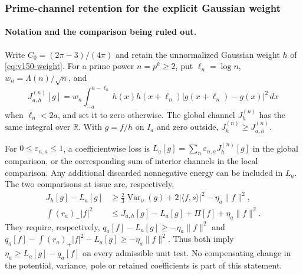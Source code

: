 \documentclass[11pt]{article}
\theoremstyle{remark}
\begin{document}
\subsubsection{Prime-channel retention for the explicit Gaussian weight}


\paragraph{Notation and the comparison being ruled out.}
Write $C_0=(2\pi-3)/(4\pi)$ and retain the unnormalized Gaussian weight
$h$ of \eqref{eq:v150-weight}. For a prime power $n=p^k\ge2$, put
$\ell_n=\log n$, $w_n=\Lambda(n)/\sqrt n$, and
\[
 J^{(n)}_{a,h}[g]
 =w_n\int_{-a}^{a-\ell_n}h(x)h(x+\ell_n)
                 |g(x+\ell_n)-g(x)|^2\,dx
\]
when $\ell_n<2a$, and set it to zero otherwise. The global channel
$J^{(n)}_h$ has the same integral over $\mathbb R$. With $g=f/h$ on
$I_a$ and zero outside, $J^{(n)}_h\ge J^{(n)}_{a,h}$.

For $0\le\varepsilon_{n,a}\le1$, a coefficientwise loss is
$L_a[g]=\sum_n\varepsilon_{n,a}J^{(n)}_h[g]$ in the global comparison,
or the corresponding sum of interior channels in the local comparison.
Any additional discarded nonnegative energy can be included in $L_a$.
The two comparisons at issue are, respectively,
\begin{align*}
 J_h[g]-L_a[g]&\ge\tfrac23\operatorname{Var}_\nu(g)
       +2|\langle f,s\rangle|^2-\eta_a\|f\|^2,\\
 \int(r_a)_-|f|^2&\le J_{a,h}[g]-L_a[g]+\Pi[f]
                                  +\eta_a\|f\|^2.
\end{align*}
They require, respectively, $q_a[f]-L_a[g]\ge-\eta_a\|f\|^2$
and $q_a[f]-\int(r_a)_+|f|^2-L_a[g]\ge-\eta_a\|f\|^2$.
Thus both imply $\eta_a\ge L_a[g]-q_a[f]$ on every admissible unit test.
No compensating change in the potential, variance, pole or retained
coefficients is part of this statement.
\end{document}
